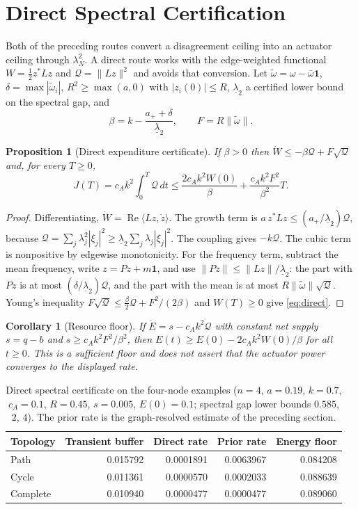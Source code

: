 \documentclass[11pt,notitlepage]{report}
\newtheorem{proposition}[theorem]{Proposition}
\newtheorem{corollary}[theorem]{Corollary}
\theoremstyle{definition}
\theoremstyle{remark}
\newcommand{\re}{\operatorname{Re}}
\newcommand{\one}{\mathbf 1}
\begin{document}
\section{Direct Spectral Certification}
Both of the preceding routes convert a disagreement ceiling into an actuator ceiling through $\lambda_N^2$. A direct route works with the edge-weighted functional $W=\tfrac12z^*Lz$ and $\mathcal Q=\|Lz\|^2$ and avoids that conversion. Let $\tilde\omega=\omega-\bar\omega\one$, $\delta=\max|\tilde\omega_i|$, $R^2\ge\max(a,0)$ with $|z_i(0)|\le R$, $\underline\lambda_2$ a certified lower bound on the spectral gap, and
\[
\beta=k-\frac{a_++\delta}{\underline\lambda_2},\qquad F=R\|\tilde\omega\|.
\]
\begin{proposition}[Direct expenditure certificate]\label{prop:direct}
If $\beta>0$ then $\dot W\le-\beta\mathcal Q+F\sqrt{\mathcal Q}$ and, for every $T\ge0$,
\begin{equation}\label{eq:direct}
J(T)=c_Ak^2\int_0^T\mathcal Q\,dt\le\frac{2c_Ak^2W(0)}\beta+\frac{c_Ak^2F^2}{\beta^2}T.
\end{equation}
\end{proposition}
\begin{proof}
Differentiating, $\dot W=\re\langle Lz,\dot z\rangle$. The growth term is $a\,z^*Lz\le(a_+/\underline\lambda_2)\mathcal Q$, because $\mathcal Q=\sum_j\lambda_j^2|\xi_j|^2\ge\underline\lambda_2\sum_j\lambda_j|\xi_j|^2$. The coupling gives $-k\mathcal Q$. The cubic term is nonpositive by edgewise monotonicity. For the frequency term, subtract the mean frequency, write $z=Pz+m\one$, and use $\|Pz\|\le\|Lz\|/\underline\lambda_2$: the part with $Pz$ is at most $(\delta/\underline\lambda_2)\mathcal Q$, and the part with the mean is at most $R\|\tilde\omega\|\sqrt{\mathcal Q}$. Young's inequality $F\sqrt{\mathcal Q}\le\tfrac\beta2\mathcal Q+F^2/(2\beta)$ and $W(T)\ge0$ give \eqref{eq:direct}.
\end{proof}
\begin{corollary}[Resource floor]\label{cor:directfloor}
If $\dot E=s-c_Ak^2\mathcal Q$ with constant net supply $s=q-b$ and $s\ge c_Ak^2F^2/\beta^2$, then $E(t)\ge E(0)-2c_Ak^2W(0)/\beta$ for all $t\ge0$. This is a sufficient floor and does not assert that the actuator power converges to the displayed rate.
\end{corollary}
\begin{table}[ht]\centering\small
\caption{Direct spectral certificate on the four-node examples ($n=4$, $a=0.19$, $k=0.7$, $c_A=0.1$, $R=0.45$, $s=0.005$, $E(0)=0.1$; spectral gap lower bounds $0.585$, $2$, $4$). The prior rate is the graph-resolved estimate of the preceding section.}
\begin{tabular}{lrrrr}\toprule
Topology&Transient buffer&Direct rate&Prior rate&Energy floor\\\midrule
Path&0.015792&0.0001891&0.0063967&0.084208\\
Cycle&0.011361&0.0000570&0.0002033&0.088639\\
Complete&0.010940&0.0000477&0.0000477&0.089060\\\bottomrule
\end{tabular}
\end{table}
\end{document}
